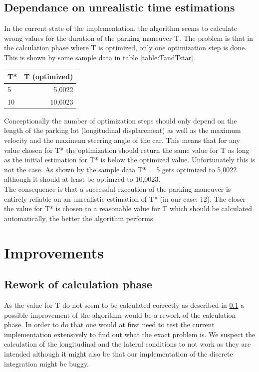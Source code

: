 \documentclass[paper=a4, fontsize=11pt]{scrreprt}
\begin{document}
\subsection{Dependance on unrealistic time estimations} \label{dependance}
In the current state of the implementation, the algorithm seems to calculate wrong values for the duration of the parking maneuver T. The problem is that in the calculation phase where T is optimized, only one optimization step is done. This is shown by some sample data in table \ref{table:TandTstar}.
\begin{center}
\label{table:TandTstar}
  \begin{tabular}{  l | r }
    T* & T (optimized) \\
    \hline
    \hline
    5 & 5,0022 \\
    \hline
    10 & 10,0023 \\
    \hline
  \end{tabular}
\end{center}
Conceptionally the number of optimization steps should only depend on the length of the parking lot (longitudinal displacement) as well as the maximum velocity and the maximum steering angle of the car. This means that for any value chosen for T* the optimization should return the same value for T as long as the initial estimation for T* is below the optimized value. Unfortunately this is not the case. As shown by the sample data T* = 5 gets optimized to 5,0022 although it should at least be optimzed to 10,0023.\\
The consequence is that a successful execution of the parking maneuver is entirely reliable on an unrealistic estimation of T* (in our case: 12). The closer the value for T* is chosen to a reasonable value for T which should be calculated automatically, the better the algorithm performs.
\section{Improvements}
\subsection{Rework of calculation phase} \label{rework}
As the value for T do not seem to be calculated correctly as described in \ref{dependance} a possible improvement of the algorithm would be a rework of the calculation phase. In order to do that one would at first need to test the current implementation extensively to find out what the exact problem is. We suspect the calculation of the longitudinal and the lateral conditions to not work as they are intended although it might also be that our implementation of the discrete integration might be buggy.
\end{document}
